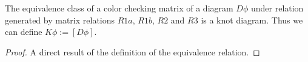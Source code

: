 \begin{theorem}
  The equivalence class of a color checking matrix of a diagram $D\phi$ under relation generated by matrix relations $R1a$, $R1b$, $R2$ and $R3$ is a knot diagram. Thus we can define $K\phi:=[D\phi]$.
\end{theorem}

\begin{proof}
  A direct result of the definition of the equivalence relation.
\end{proof}
